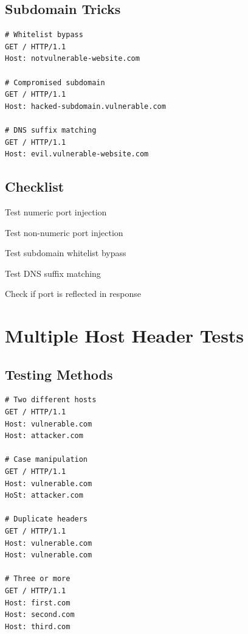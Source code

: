 \documentclass[12pt,a4paper]{article}
\begin{document}
\subsection{Subdomain Tricks}
\begin{lstlisting}[caption=Subdomain Tests]
# Whitelist bypass
GET / HTTP/1.1
Host: notvulnerable-website.com

# Compromised subdomain
GET / HTTP/1.1
Host: hacked-subdomain.vulnerable.com

# DNS suffix matching
GET / HTTP/1.1
Host: evil.vulnerable-website.com
\end{lstlisting}

\subsection{Checklist}
\begin{checklistbox}
 Test numeric port injection
\end{checklistbox}
\begin{checklistbox}
 Test non-numeric port injection
\end{checklistbox}
\begin{checklistbox}
 Test subdomain whitelist bypass
\end{checklistbox}
\begin{checklistbox}
 Test DNS suffix matching
\end{checklistbox}
\begin{checklistbox}
 Check if port is reflected in response
\end{checklistbox}

\section{Multiple Host Header Tests}

\subsection{Testing Methods}
\begin{lstlisting}[caption=Multiple Header Tests]
# Two different hosts
GET / HTTP/1.1
Host: vulnerable.com
Host: attacker.com

# Case manipulation
GET / HTTP/1.1
Host: vulnerable.com
HoSt: attacker.com

# Duplicate headers
GET / HTTP/1.1
Host: vulnerable.com
Host: vulnerable.com

# Three or more
GET / HTTP/1.1
Host: first.com
Host: second.com
Host: third.com
\end{lstlisting}
\end{document}
